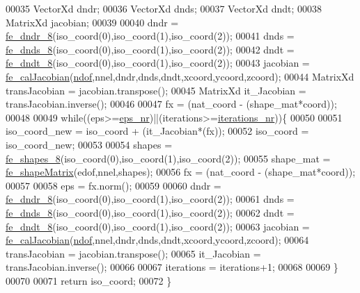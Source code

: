 \begin{DoxyCode}
00035     VectorXd dndr;
00036     VectorXd dnds;
00037     VectorXd dndt;
00038     MatrixXd jacobian;
00039 
00040     dndr = \hyperlink{functions_8h_afc547bef246c057db6cbd04bf7f866a9}{fe\_dndr\_8}(iso\_coord(0),iso\_coord(1),iso\_coord(2));
00041     dnds = \hyperlink{functions_8h_ac0b5524525e1f2e89bb064c15ab8e664}{fe\_dnds\_8}(iso\_coord(0),iso\_coord(1),iso\_coord(2));
00042     dndt = \hyperlink{functions_8h_a57e8e5c9f740c98e4767f29c121c2d0a}{fe\_dndt\_8}(iso\_coord(0),iso\_coord(1),iso\_coord(2));
00043     jacobian = \hyperlink{functions_8h_a5ae3771e65b4a0d177097041a4349c28}{fe\_calJacobian}(\hyperlink{_global_variables_8h_aa789fe4d8a13fd0990b630909430d5d0}{ndof},nnel,dndr,dnds,dndt,xcoord,ycoord,zcoord);
00044     MatrixXd transJacobian = jacobian.transpose();
00045     MatrixXd it\_Jacobian = transJacobian.inverse();
00046 
00047     fx = (nat\_coord - (shape\_mat*coord)); 
00048     
00049     \textcolor{keywordflow}{while}((eps>=\hyperlink{fe__newton_rhapson_8cpp_ad3d80cd8d6370090eb6cc57a523bcd6c}{eps\_nr})||(iterations>=\hyperlink{fe__newton_rhapson_8cpp_a43f0d7a4e9f3ece65db80d07bb79192f}{iterations\_nr}))\{
00050 
00051         iso\_coord\_new = iso\_coord + (it\_Jacobian*(fx));
00052         iso\_coord = iso\_coord\_new;
00053         
00054         shapes = \hyperlink{functions_8h_ab77a3a6d6f6b436d7e8c600bb0869927}{fe\_shapes\_8}(iso\_coord(0),iso\_coord(1),iso\_coord(2));
00055         shape\_mat = \hyperlink{functions_8h_a98fae74dde5fe33a7062e7457a2d3227}{fe\_shapeMatrix}(edof,nnel,shapes);
00056         fx = (nat\_coord - (shape\_mat*coord)); 
00057 
00058         eps = fx.norm();
00059 
00060         dndr = \hyperlink{functions_8h_afc547bef246c057db6cbd04bf7f866a9}{fe\_dndr\_8}(iso\_coord(0),iso\_coord(1),iso\_coord(2));
00061         dnds = \hyperlink{functions_8h_ac0b5524525e1f2e89bb064c15ab8e664}{fe\_dnds\_8}(iso\_coord(0),iso\_coord(1),iso\_coord(2));
00062         dndt = \hyperlink{functions_8h_a57e8e5c9f740c98e4767f29c121c2d0a}{fe\_dndt\_8}(iso\_coord(0),iso\_coord(1),iso\_coord(2));
00063         jacobian = \hyperlink{functions_8h_a5ae3771e65b4a0d177097041a4349c28}{fe\_calJacobian}(\hyperlink{_global_variables_8h_aa789fe4d8a13fd0990b630909430d5d0}{ndof},nnel,dndr,dnds,dndt,xcoord,ycoord,zcoord);
00064         transJacobian = jacobian.transpose();
00065         it\_Jacobian = transJacobian.inverse(); 
00066 
00067         iterations = iterations+1;
00068 
00069     \}
00070 
00071     \textcolor{keywordflow}{return} iso\_coord;
00072 \}
\end{DoxyCode}
